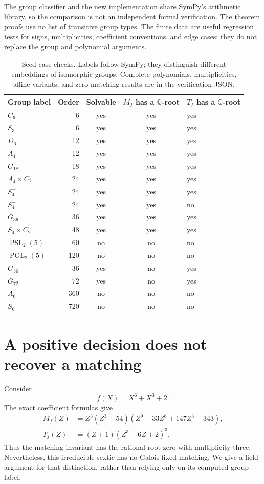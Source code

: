 \documentclass[11pt,letterpaper]{article}
\numberwithin{equation}{section}
\theoremstyle{definition}
\theoremstyle{remark}
\newcommand{\QQ}{\mathbb Q}
\begin{document}
The group classifier and the new implementation share SymPy's arithmetic
library, so the comparison is not an independent formal verification.
The theorem proofs use no list of transitive group types. The finite data
are useful regression tests for signs, multiplicities, coefficient
conventions, and edge cases; they do not replace the group and polynomial
arguments.

\begin{table}[htbp]
\centering\small
\begin{tabular}{@{}lrccl@{}}
\toprule
Group label & Order & Solvable & $M_f$ has a $\QQ$-root & $T_f$ has a $\QQ$-root\\
\midrule
$C_6$ &6&yes&yes&yes\\
$S_3$ &6&yes&yes&yes\\
$D_6$ &12&yes&yes&yes\\
$A_4$ &12&yes&yes&yes\\
$G_{18}$ &18&yes&yes&yes\\
$A_4\times C_2$ &24&yes&yes&yes\\
$S_4^+$ &24&yes&yes&yes\\
$S_4^-$ &24&yes&yes&no\\
$G_{36}^-$ &36&yes&yes&yes\\
$S_4\times C_2$ &48&yes&yes&yes\\
$\operatorname{PSL}_2(5)$ &60&no&no&no\\
$\operatorname{PGL}_2(5)$ &120&no&no&no\\
$G_{36}^+$ &36&yes&no&yes\\
$G_{72}$ &72&yes&no&yes\\
$A_6$ &360&no&no&no\\
$S_6$ &720&no&no&no\\
\bottomrule
\end{tabular}
\caption{Seed-case checks. Labels follow SymPy; they distinguish different
embeddings of isomorphic groups. Complete polynomials, multiplicities,
affine variants, and zero-matching results are in the verification JSON.}
\label{zpt:tab:groups}
\end{table}

\section{A positive decision does not recover a matching}
\label{zpt:sec:example}
Consider
\begin{equation}
 f(X)=X^6+X^3+2.\label{zpt:eq:example}
\end{equation}
The exact coefficient formulas give
\begin{align}
 M_f(Z)&=Z^3(Z^3-54)
       (Z^9-33Z^6+147Z^3+343),\label{zpt:eq:example-M}\\
 T_f(Z)&=(Z+1)(Z^3-6Z+2)^3.\label{zpt:eq:example-T}
\end{align}
Thus the matching invariant has the rational root zero with multiplicity
three. Nevertheless, this irreducible sextic has no Galois-fixed matching.
We give a field argument for that distinction, rather than relying only
on its computed group label.
\end{document}
